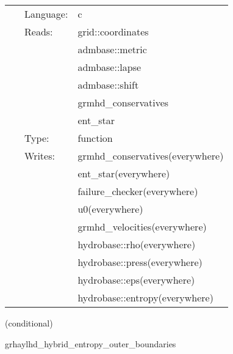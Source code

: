\documentclass{article}
\begin{document}
\hspace{5mm}{\it entropy+hybrid version of grhaylhd\_conservs\_to\_prims } 


\hspace{5mm}

 \begin{tabular*}{160mm}{cll} 
~ & Language:  & c \\ 
~ & Reads:  & grid::coordinates \\ 
~& ~ &admbase::metric\\ 
~& ~ &admbase::lapse\\ 
~& ~ &admbase::shift\\ 
~& ~ &grmhd\_conservatives\\ 
~& ~ &ent\_star\\ 
~ & Type:  & function \\ 
~ & Writes:  & grmhd\_conservatives(everywhere) \\ 
~& ~ &ent\_star(everywhere)\\ 
~& ~ &failure\_checker(everywhere)\\ 
~& ~ &u0(everywhere)\\ 
~& ~ &grmhd\_velocities(everywhere)\\ 
~& ~ &hydrobase::rho(everywhere)\\ 
~& ~ &hydrobase::press(everywhere)\\ 
~& ~ &hydrobase::eps(everywhere)\\ 
~& ~ &hydrobase::entropy(everywhere)\\ 
\end{tabular*} 


\vspace{5mm}

   (conditional) 

\hspace{5mm} grhaylhd\_hybrid\_entropy\_outer\_boundaries 

\hspace{5mm}{\it entropy+hybrid version of grhaylhd\_outer\_boundaries } 


\hspace{5mm}
\end{document}
